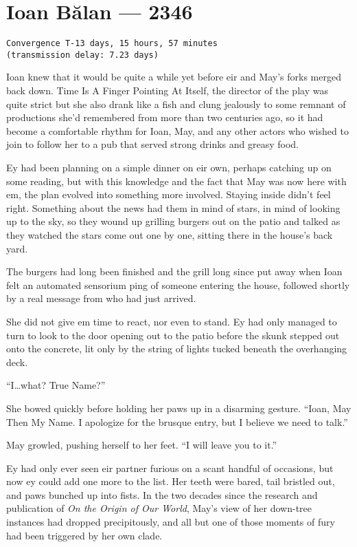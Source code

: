 \hypertarget{ioan-bux103lan-2346}{%
\chapter{Ioan Bălan — 2346}\label{ioan-bux103lan-2346}}

\begin{verbatim}
Convergence T-13 days, 15 hours, 57 minutes
(transmission delay: 7.23 days)
\end{verbatim}

Ioan knew that it would be quite a while yet before eir and May's forks merged back down. Time Is A Finger Pointing At Itself, the director of the play was quite strict but she also drank like a fish and clung jealously to some remnant of productions she'd remembered from more than two centuries ago, so it had become a comfortable rhythm for Ioan, May, and any other actors who wished to join to follow her to a pub that served strong drinks and greasy food.

Ey had been planning on a simple dinner on eir own, perhaps catching up on some reading, but with this knowledge and the fact that May was now here with em, the plan evolved into something more involved. Staying inside didn't feel right. Something about the news had them in mind of stars, in mind of looking up to the sky, so they wound up grilling burgers out on the patio and talked as they watched the stars come out one by one, sitting there in the house's back yard.

The burgers had long been finished and the grill long since put away when Ioan felt an automated sensorium ping of someone entering the house, followed shortly by a real message from who had just arrived.

She did not give em time to react, nor even to stand. Ey had only managed to turn to look to the door opening out to the patio before the skunk stepped out onto the concrete, lit only by the string of lights tucked beneath the overhanging deck.

``I\ldots what? True Name?''

She bowed quickly before holding her paws up in a disarming gesture. ``Ioan, May Then My Name. I apologize for the brusque entry, but I believe we need to talk.''

May growled, pushing herself to her feet. ``I will leave you to it.''

Ey had only ever seen eir partner furious on a scant handful of occasions, but now ey could add one more to the list. Her teeth were bared, tail bristled out, and paws bunched up into fists. In the two decades since the research and publication of \emph{On the Origin of Our World}, May's view of her down-tree instances had dropped precipitously, and all but one of those moments of fury had been triggered by her own clade.

